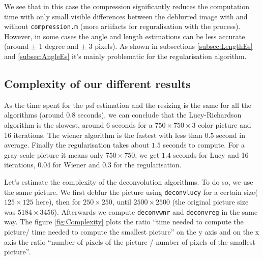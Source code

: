 We see that in this case the compression significantly reduces the computation time with only small visible differences between the deblurred image with and without \texttt{compression.m} (more artifacts for reguralisation with the  process). 
However, in some cases the angle and length estimations can be less accurate (around $\pm$ 1 degree and $\pm$ 3 pixels). As shown in subsections \ref{subsec:LengthEs} and \ref{subsec:AngleEs} it's mainly problematic for the regularisation algorithm.

\subsection{Complexity of our different results}

As the time spent for the psf estimation and the resizing is the same for all the algorithms (around 0.8 seconds), we can conclude that the Lucy-Richardson algorithm is the slowest, around $6 $ seconds for a $750 \times 750 \times 3$ color picture and 16 iterations. The wiener algorithm is the fastest with less than $0.5$ second in average. Finally the regularisation takes about $1.5$ seconds to compute. For a gray scale picture it means only $750 \times 750$, we get $1.4$ seconds for Lucy and 16 iterations, $0.04$ for Wiener and $0.3$ for the regularisation. 

Let's estimate the complexity of the deconvolution algorithms. To do so, we use the same picture. We first deblur the picture using \texttt{deconvlucy} for a certain size($125 \times 125$ here), then for $250 \times 250$, until $2500 \times 2500$ (the original picture  size was $5184 \times 3456$). Afterwards we compute  \texttt{deconvwnr} and \texttt{deconvreg} in the same way. The figure \ref{fig:Complexity} plots the ratio ``time needed to compute the picture/ time needed to compute the smallest picture'' on the y axis and on the x axis the ratio ``number of pixels of the picture / number of pixels of the smallest picture''. 


